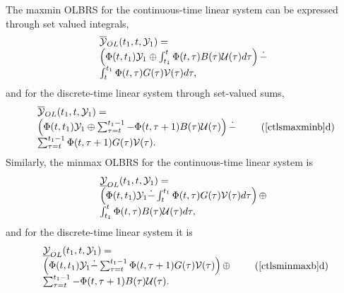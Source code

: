 \documentclass[letterpaper,10pt,english]{sphinxmanual}
\begin{document}
The maxmin OLBRS for the continuous-time linear system can be expressed
through set valued integrals,
\begin{gather}
\begin{split}\begin{array}{l}
\overline{{\mathcal Y}}_{OL}(t_1, t, {\mathcal Y}_1) = \\
\left(\Phi(t, t_1){\mathcal Y}_1 \oplus
\int_{t_1}^t\Phi(t, \tau)B(\tau){\mathcal U}(\tau)d\tau\right) \dot{-} \\
\int_{t}^{t_1}\Phi(t, \tau)G(\tau){\mathcal V}(\tau)d\tau,
\end{array}
\label{ctlsmaxminb}\end{split}\notag
\end{gather}
and for the discrete-time linear system through set-valued sums,
\begin{gather}
\begin{split}\begin{array}{l}
\overline{{\mathcal Y}}_{OL}(t_1, t, {\mathcal Y}_1) = \\
\left(\Phi(t, t_1){\mathcal Y}_1 \oplus
\sum_{\tau=t}^{t_1-1}-\Phi(t, \tau+1)B(\tau){\mathcal U}(\tau)\right) \dot{-} \\
\sum_{\tau=t}^{t_1-1}\Phi(t, \tau+1)G(\tau){\mathcal V}(\tau).
\end{array}
\tag*{(\ref{ctlsmaxminb}d)}
\label{dtlsmaxminb}\end{split}\notag
\end{gather}
Similarly, the minmax OLBRS for the continuous-time linear system is
\begin{gather}
\begin{split}\begin{array}{l}
\underline{{\mathcal Y}}_{OL}(t_1, t, {\mathcal Y}_1) = \\
\left(\Phi(t, t_1){\mathcal Y}_1 \dot{-}
\int_{t}^{t_1}\Phi(t, \tau)G(\tau){\mathcal V}(\tau)d\tau\right)
\oplus \\
\int_{t_1}^{t}\Phi(t, \tau)B(\tau){\mathcal U}(\tau)d\tau,
\end{array}
\label{ctlsminmaxb}\end{split}\notag
\end{gather}
and for the discrete-time linear system it is
\begin{gather}
\begin{split}\begin{array}{l}
\underline{{\mathcal Y}}_{OL}(t_1, t, {\mathcal Y}_1) = \\
\left(\Phi(t, t_1){\mathcal Y}_1 \dot{-}
\sum_{\tau=t}^{t_1-1}\Phi(t, \tau+1)G(\tau){\mathcal V}(\tau)\right)
\oplus \\
\sum_{\tau=t}^{t_1-1}-\Phi(t, \tau+1)B(\tau){\mathcal U}(\tau).
\end{array}
\tag*{(\ref{ctlsminmaxb}d)}
\label{dtlsminmaxb}\end{split}\notag
\end{gather}
\end{document}

